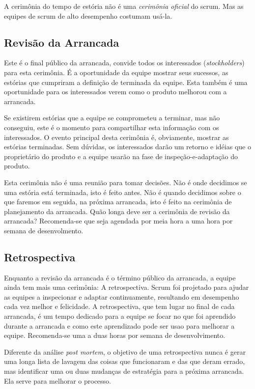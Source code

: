 A cerimônia do tempo de estória não é uma \emph{cerimônia oficial} do scrum. Mas as equipes de scrum de alto desempenho costumam usá-la.

\subsection{Revisão da Arrancada}

Este é o final público da arrancada, convide todos os interessados (\textit{stockholders}) para esta cerimônia. É a oportunidade da equipe mostrar seus sucessos, as estórias que cumpriram a definição de terminada da equipe. Esta também é uma oportunidade para os interessados verem como o produto melhorou com a arrancada.

Se existirem estórias que a equipe se comprometeu a terminar, mas não conseguiu, este é o momento para compartilhar esta informação com os interessados. O evento principal desta cerimônia é, obviamente, mostrar as estórias terminadas. Sem dúvidas, os interessados darão um retorno e idéias que o proprietário do produto e a equipe usarão na fase de inspeção-e-adaptação do produto.

Esta cerimônia não é uma reunião para tomar decisões. Não é onde decidimos se uma estória está terminada, isto é feito antes. Não é quando decidimos sobre o que faremos em seguida, na próxima arrancada, isto é feito na cerimônia de planejamento da arrancada.
Quão longa deve ser a cerimônia de revisão da arrancada? Recomenda-se que seja agendada por meia hora a uma hora por semana de desenvolmento.

\subsection{Retrospectiva}

Enquanto a revisão da arrancada é o término público da arrancada, a equipe ainda tem mais uma cerimônia: A retrospectiva. Scrum foi projetado para ajudar as equipes a inspecionar e adaptar continuamente, resultando em desempenho cada vez melhor e felicidade. A retrospectiva, que tem lugar no final de cada arrancada, é um tempo dedicado para a equipe se focar no que foi aprendido durante a arrancada e como este aprendizado pode ser usao para melhorar a equipe. Recomenda-se uma a duas horas por semana de desenvolvimento.

Diferente da análise \textit{post mortem}, o objetivo de uma retrospectiva nunca é gerar uma longa lista de lavagem das coisas que funcionaram e das que deram errado, mas identificar uma ou duas mudanças de estratégia para a próxima arrancada. Ela serve para melhorar o processo.

